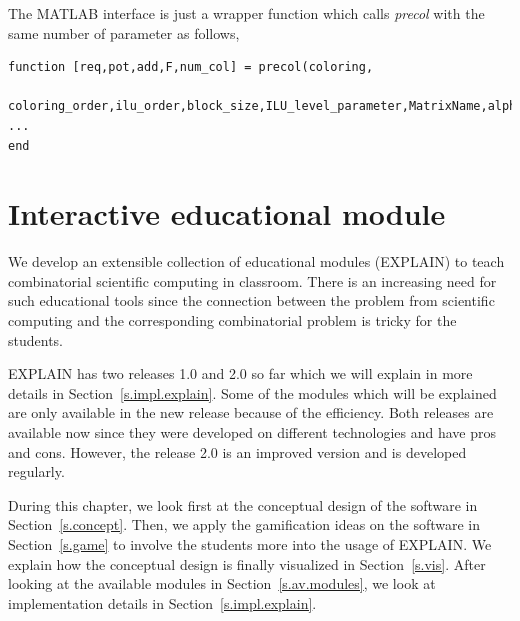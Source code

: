 \documentclass[12pt, twoside,a4paper,toc=bibliography]{scrbook}
\newcommand{\secref}[1]{Section~\protect\ref{#1}}
\begin{document}
The MATLAB interface is just a wrapper function which calls \textit{precol} with
the same number of parameter as follows,
\begin{lstlisting}
function [req,pot,add,F,num_col] = precol(coloring,
	coloring_order,ilu_order,block_size,ILU_level_parameter,MatrixName,alpha)
...
end
\end{lstlisting}
\chapter{Interactive educational module}
\label{explain}
We develop an extensible collection of educational modules (\mbox{EXPLAIN})
to teach combinatorial scientific computing in classroom.
There is an increasing need for such educational tools since the connection
between the problem from scientific computing and the corresponding combinatorial
problem is tricky for the students.

\mbox{EXPLAIN} has two releases 1.0 and 2.0 so far which we will explain in more
details in \secref{s.impl.explain}. Some of the modules which will be explained
are only available in the new release because of the efficiency. Both releases
are available now since they were developed on different technologies and have
pros and cons. However, the release 2.0 is an improved version and is developed
regularly.

During this chapter, we look first at the conceptual design of the software in
\secref{s.concept}. Then, we apply the gamification ideas on the software in
\secref{s.game} to involve the students more into the usage of \mbox{EXPLAIN}.
We explain how the conceptual design is finally visualized in \secref{s.vis}.
After looking at the available modules in \secref{s.av.modules}, we look at
implementation details in \secref{s.impl.explain}.
\end{document}
